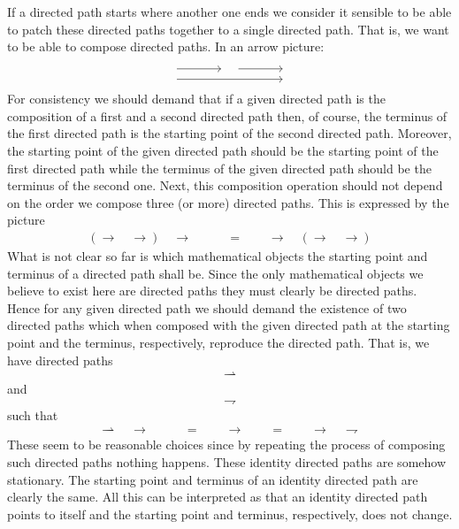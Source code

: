 If a directed path starts where another one ends we consider it sensible to be able to patch these directed paths together to a single directed path. That is, we want to be able to compose directed paths. In an arrow picture:
\[
\begin{tikzcd}[sep=large]
  \phantom{1}
  \arrow[shift left=1ex]{r}{}
  \arrow[shift right=1ex]{rr}{}
  &
  \phantom{1}
  \arrow[shift left=1ex]{r}{}
  &
  \phantom{1}
\end{tikzcd}
\]
For consistency we should demand that if a given directed path is the composition of a first and a second directed path then, of course, the terminus of the first directed path is the starting point of the second directed path. Moreover, the starting point of the given directed path should be the starting point of the first directed path while the terminus of the given directed path should be the terminus of the second one. Next, this composition operation should not depend on the order we compose three (or more) directed paths. This is expressed by the picture
\begin{align*}
  \left(
    \longrightarrow
    \quad
    \longrightarrow
  \right)
  \quad
  \longrightarrow
  \qquad
  &=
  \qquad
  \longrightarrow
  \quad
  \left(
    \longrightarrow
    \quad
    \longrightarrow
  \right)
\end{align*}
What is not clear so far is which mathematical objects the starting point and terminus of a directed path shall be. Since the only mathematical objects we believe to exist here are directed paths they must clearly be directed paths. Hence for any given directed path we should demand the existence of two directed paths which when composed with the given directed path at the starting point and the terminus, respectively, reproduce the directed path. That is, we have directed paths
\begin{align*}
  \rightharpoonup
\end{align*}
and
\begin{align*}
  \rightharpoondown
\end{align*}
such that
\begin{align*}
  \rightharpoonup
  \quad
  \longrightarrow
  \qquad
  &=
  \qquad
  \longrightarrow  
  \qquad
  =
  \qquad
  \longrightarrow
  \quad
  \rightharpoondown
\end{align*}
These seem to be reasonable choices since by repeating the process of composing such directed paths nothing happens. These identity directed paths are somehow stationary. The starting point and terminus of an identity directed path are clearly the same. All this can be interpreted as that an identity directed path points to itself and the starting point and terminus, respectively, does not change.
